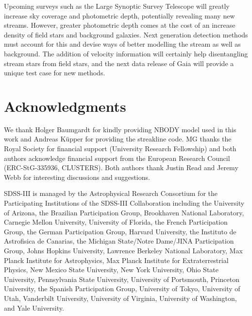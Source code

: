 \documentclass[useAMS,usenatbib,fleqn]{mnras}
\begin{document}
Upcoming surveys such as the Large Synoptic Survey Telescope
\citep[LSST][]{LSST} will greatly increase sky coverage and photometric depth,
potentially revealing many new streams. However, greater photometric depth comes
at the cost of an increase density of field stars {and background galaxies}.
Next generation detection methods must account for this and devise ways of
better modelling the stream as well as background. The addition of velocity
information will certainly help disentangling stream stars from field stars, and
the next data release of Gaia will provide a unique test case for new methods.

\section*{Acknowledgments}

We thank Holger Baumgardt for kindly providing NBODY model used in this work and
Andreas K{\"u}pper for providing the streakline code. MG thanks the Royal
Society for financial support (University Research Fellowship) and both authors
acknowledge financial support from the European Research Council
(ERC-StG-335936, CLUSTERS). Both authors thank Justin Read and Jeremy Webb for
interesting discussions and suggestions.

SDSS-III is managed by the Astrophysical Research Consortium for the
Participating Institutions of the SDSS-III Collaboration including the
University of Arizona, the Brazilian Participation Group, Brookhaven National
Laboratory, Carnegie Mellon University, University of Florida, the French
Participation Group, the German Participation Group, Harvard University, the
Instituto de Astrofisica de Canarias, the Michigan State/Notre Dame/JINA
Participation Group, Johns Hopkins University, Lawrence Berkeley National
Laboratory, Max Planck Institute for Astrophysics, Max Planck Institute for
Extraterrestrial Physics, New Mexico State University, New York University, Ohio
State University, Pennsylvania State University, University of Portsmouth,
Princeton University, the Spanish Participation Group, University of Tokyo,
University of Utah, Vanderbilt University, University of Virginia, University of
Washington, and Yale University.

\newpage







\label{lastpage}
\end{document}
